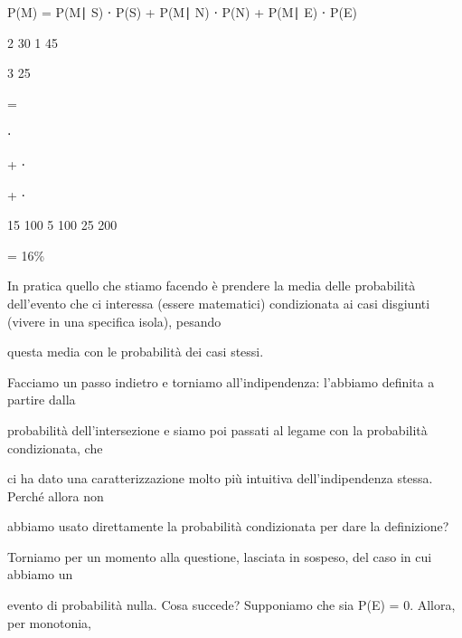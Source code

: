 \documentclass[a4paper,portrait,12pt]{article}
\begin{document}
\begin{flushleft}
P(M) = P(M∣ S) ⋅ P(S) + P(M∣ N) ⋅ P(N) + P(M∣ E) ⋅ P(E)
\end{flushleft}


2 30 1 45


3 25


=


⋅


+ ⋅


+ ⋅


15 100 5 100 25 200


= 16\%


\begin{flushleft}
In pratica quello che stiamo facendo \`{e} prendere la media delle probabilit\`{a} dell'evento che ci interessa (essere matematici) condizionata ai casi disgiunti (vivere in una specifica isola), pesando
\end{flushleft}


\begin{flushleft}
questa media con le probabilit\`{a} dei casi stessi.
\end{flushleft}


\begin{flushleft}
Facciamo un passo indietro e torniamo all'indipendenza: l'abbiamo definita a partire dalla
\end{flushleft}


\begin{flushleft}
probabilit\`{a} dell'intersezione e siamo poi passati al legame con la probabilit\`{a} condizionata, che
\end{flushleft}


\begin{flushleft}
ci ha dato una caratterizzazione molto più intuitiva dell'indipendenza stessa. Perch\'{e} allora non
\end{flushleft}


\begin{flushleft}
abbiamo usato direttamente la probabilit\`{a} condizionata per dare la definizione?
\end{flushleft}


\begin{flushleft}
Torniamo per un momento alla questione, lasciata in sospeso, del caso in cui abbiamo un
\end{flushleft}


\begin{flushleft}
evento di probabilit\`{a} nulla. Cosa succede? Supponiamo che sia P(E) = 0. Allora, per monotonia,
\end{flushleft}
\end{document}
